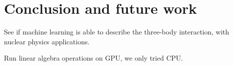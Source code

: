 \chapter{Conclusion and future work} \label{sec:conclusion}
See if machine learning is able to describe the three-body interaction, with nuclear physics applications. 

Run linear algebra operations on GPU, we only tried CPU. 